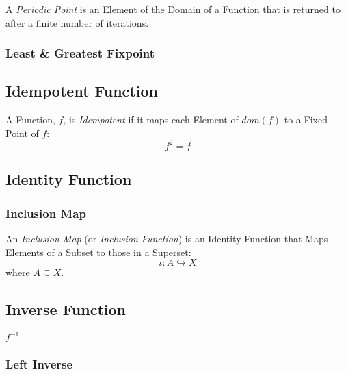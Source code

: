 A \emph{Periodic Point} is an Element of the Domain of a Function that
is returned to after a finite number of iterations.



\subsubsection{Least \& Greatest Fixpoint}
\label{sec:leastgreatest_fixpoint}



\subsection{Idempotent Function}\label{sec:idempotent}

A Function, $f$, is \emph{Idempotent} if it maps each Element of
$dom(f)$ to a Fixed Point of $f$:
\[
  f^2 = f
\]



\subsection{Identity Function}\label{sec:identity_function}

\subsubsection{Inclusion Map}\label{sec:inclusion_map}

An \emph{Inclusion Map} (or \emph{Inclusion Function}) is an Identity
Function that Maps Elements of a Subset to those in a Superset:
\[
  \iota : A \hookrightarrow X
\]
where $A \subseteq X$.



\subsection{Inverse Function}\label{sec:inverse_function}

$f^{-1}$



\subsubsection{Left Inverse}\label{sec:left_inverse}

